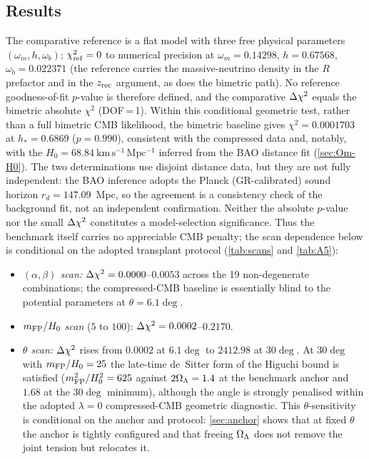 \subsection{Results}\label{sec:cmbres}
The comparative reference is a flat \LCDM{} model with three free physical parameters $(\omega_m,h,\omega_b)$; $\chi^2_{\rm ref}=0$ to numerical precision at $\omega_m=0.14298$, $h=0.67568$, $\omega_b=0.022371$ (the reference carries the massive-neutrino density in the $R$ prefactor and in the $z_{\rm rec}$ argument, as does the bimetric path). No reference goodness-of-fit $p$-value is therefore defined, and the comparative $\Delta\chi^2$ equals the bimetric absolute $\chi^2$ (DOF\,=\,1).
Within this conditional geometric test, rather than a full bimetric CMB likelihood, the bimetric baseline gives $\chi^2=0.0001703$ at $h_*=0.6869$ ($p=0.990$), consistent with the compressed data and, notably, with the $H_0=68.84\ \mathrm{km\,s^{-1}\,Mpc^{-1}}$ inferred from the BAO distance fit (\cref{sec:Om-H0}). The two determinations use disjoint distance data, but they are not fully independent: the BAO inference adopts the Planck (GR-calibrated) sound horizon $r_d=147.09$~Mpc, so the agreement is a consistency check of the background fit, not an independent confirmation. Neither the absolute $p$-value nor the small $\Delta\chi^2$ constitutes a model-selection significance. Thus the benchmark itself carries no appreciable CMB penalty; the scan dependence below is conditional on the adopted transplant protocol (\cref{tab:scans} and \cref{tab:A5}):
\begin{itemize}
\item \emph{$(\alpha,\beta)$ scan:} $\Delta\chi^2=0.0000$--$0.0053$ across the 19 non-degenerate combinations; the compressed-CMB baseline is essentially blind to the potential parameters at $\theta=6.1\deg$.
\item \emph{$m_{\mathrm{FP}}/H_0$ scan} ($5$ to $100$): $\Delta\chi^2=0.0002$--$0.2170$.
\item \emph{$\theta$ scan:} $\Delta\chi^2$ rises from $0.0002$ at $6.1\deg$ to $2412.98$ at $30\deg$. At $30\deg$ with $m_{\mathrm{FP}}/H_0=25$ the late-time de~Sitter form of the Higuchi bound is satisfied ($m_{\mathrm{FP}}^2/H_0^2=625$ against $2\Omega_{\Lambda}=1.4$ at the benchmark anchor and $1.68$ at the $30\deg$ minimum), although the angle is strongly penalised within the adopted $\lambda=0$ compressed-CMB geometric diagnostic. This $\theta$-sensitivity is conditional on the anchor and protocol: \cref{sec:anchor} shows that at fixed $\theta$ the anchor is tightly configured and that freeing $\Omega_{\Lambda}$ does not remove the joint tension but relocates it.
\end{itemize}


